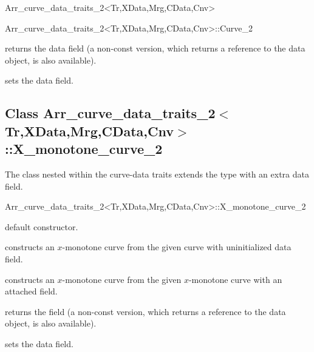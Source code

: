 \begin{ccRefClass}{Arr_curve_data_traits_2<Tr,XData,Mrg,CData,Cnv>}
\begin{ccClass}{Arr_curve_data_traits_2<Tr,XData,Mrg,CData,Cnv>::Curve_2}
\ccAccessFunctions

  {returns the data field (a non-const version, which returns a reference
   to the data object, is also available).}

  {sets the data field.}

\end{ccClass}

\subsection*{Class Arr\_curve\_data\_traits\_2$<$Tr,XData,Mrg,CData,Cnv$>$::X\_monotone\_curve\_2}

The  class nested within the
curve-data traits extends the  type
with an extra data field.

\begin{ccClass}{Arr_curve_data_traits_2<Tr,XData,Mrg,CData,Cnv>::X_monotone_curve_2}

\ccInheritsFrom

\ccCreation
{}

    {default constructor.}

    {constructs an $x$-monotone curve from the given  curve with
     uninitialized data field.}

    {constructs an $x$-monotone curve from the given  $x$-monotone
     curve with an attached  field.}

\ccAccessFunctions

  {returns the field (a non-const version, which returns a reference
   to the data object, is also available).}

  {sets the data field.}

\end{ccClass}

\end{ccRefClass}

\ccRefPageEnd
